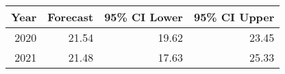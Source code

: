 \begin{table}[!h]
\centering
\begin{tabular}{rrrr}
\toprule
Year & Forecast & 95\% CI Lower & 95\% CI Upper\\
\midrule
2020 & 21.54 & 19.62 & 23.45\\
2021 & 21.48 & 17.63 & 25.33\\
\bottomrule
\end{tabular}
\end{table}
